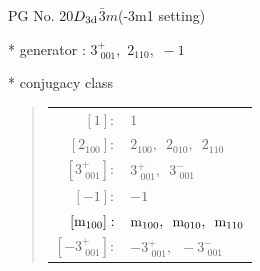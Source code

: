 \documentclass[fleqn,8pt]{jsarticle}
\begin{document}
\setcounter{MaxMatrixCols}{32}

\renewcommand{\tablename}{Table~}
\renewcommand{\figurename}{Figure~}
\begin{center}
\LARGE
PG No. 20\quad$D_{\rm 3d}$\quad$\bar{3}m$\quad(-3m1 setting)\quad[ trigonal ]
\end{center}

* generator : $3^{+}_{\,\,001},\,\,2{}_{110},\,\,-1$

* conjugacy class
\begin{quote}
\begin{tabular}{rl}
$ [1]: $ & $ 1 $ \\
$ [2{}_{100}]: $ & $ 2{}_{100},\,\,\,2{}_{010},\,\,\,2{}_{110} $ \\
$ [3^{+}_{\,\,001}]: $ & $ 3^{+}_{\,\,001},\,\,\,3^{-}_{\,\,001} $ \\
$ [-1]: $ & $ -1 $ \\
$ [{\rm m}_{100}]: $ & $ {\rm m}_{100},\,\,\,{\rm m}_{010},\,\,\,{\rm m}_{110} $ \\
$ [-3^{+}_{\,\,001}]: $ & $ -3^{+}_{\,\,001},\,\,\,-3^{-}_{\,\,001} $
\end{tabular}
\end{quote}
\end{document}
